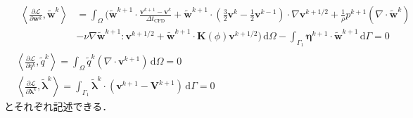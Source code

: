 \documentclass[a4paper,xelatex,ja=standard]{bxjsarticle}
\begin{document}
\begin{align}
    &\begin{aligned}
        \label{eq:foward_w}
        \left\langle\frac{\partial \mathcal{L}}{\partial \mathbf{w}^k}, \tilde{\mathbf{w}}^k\right\rangle
        & = \int_{\Omega} \bigg( \tilde{\mathbf{w}}^{k+1} \cdot \frac{\mathbf{v}^{k+1}-\mathbf{v}^k}{\Delta t_{\text{CFD}}}
        +\tilde{\mathbf{w}}^{k+1} \cdot \left( \frac{3}{2}\mathbf{v}^k - \frac{1}{2}\mathbf{v}^{k-1} \right) \cdot \nabla \mathbf{v}^{k+1 / 2} 
        + \frac{1}{\rho} p^{k+1} (\nabla \cdot \tilde{\mathbf{w}}^{k}) \\
        &- \nu \nabla \tilde{\mathbf{w}}^{k+1} : \mathbf{v}^{k+1/2} + \tilde{\mathbf{w}}^{k+1} \cdot \mathbf{K}(\phi) \mathbf{v}^{k+1/2} \bigg) \, \mathrm{d}\Omega
        - \int_{\Gamma_1} \boldsymbol{\eta}^{k+1} \cdot \tilde{\mathbf{w}}^{k+1} \, \mathrm{d}\Gamma = 0
    \end{aligned} \\
    \label{eq:foward_q} 
    & \left\langle\frac{\partial \mathcal{L}}{\partial q^k}, \tilde{q}^k\right\rangle
    =\int_{\Omega} \tilde{q}^k(\nabla \cdot \mathbf{v}^{k+1}) \, \mathrm{d}\Omega
    = 0 \\
    \label{eq:foward_lambda} 
    &\left\langle\frac{\partial \mathcal{L}}{\partial \boldsymbol{\lambda}^k}, \tilde{\boldsymbol{\lambda}}^k\right\rangle
    = \int_{\Gamma_1} \tilde{\boldsymbol{\lambda}}^k \cdot (\mathbf{v}^{k+1} - \mathbf{V}^{k+1}) \, \mathrm{d}\Gamma
    = 0
\end{align}
とそれぞれ記述できる．
\end{document}
